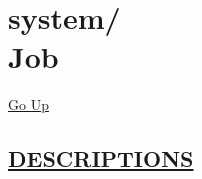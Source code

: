 \chapter*{\color{headfile}
{\large system\slash\hspace{0pt}}
 \\
Job
}
\hypertarget{ecldoc:toc:system.Job}{}
\hyperlink{ecldoc:toc:root/system}{Go Up}


\section*{\underline{\textsf{DESCRIPTIONS}}}
